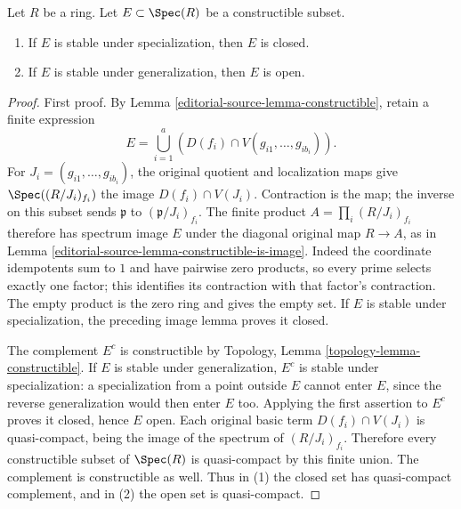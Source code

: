 \begin{lemma}
\label{editorial-source-lemma-constructible-stable-specialization-closed}
Let $R$ be a ring. Let $E \subset \Spec(R)$ be a constructible subset.
\begin{enumerate}
\item If $E$ is stable under specialization, then $E$ is closed.
\item If $E$ is stable under generalization, then $E$ is open.
\end{enumerate}
\end{lemma}

\begin{proof}
First proof. By Lemma \ref{editorial-source-lemma-constructible}, retain
a finite expression
$$
E=\bigcup_{i=1}^a\left(D(f_i)\cap
V(g_{i1},\ldots,g_{ib_i})\right).
$$
For $J_i=(g_{i1},\ldots,g_{ib_i})$, the original
quotient and localization maps give
$\Spec((R/J_i)_{f_i})$ the image $D(f_i)\cap V(J_i)$.
Contraction is the map; the inverse on this subset
sends $\mathfrak p$ to $(\mathfrak p/J_i)_{f_i}$.
The finite product $A=\prod_i(R/J_i)_{f_i}$ therefore
has spectrum image $E$ under the diagonal original
map $R\to A$, as in Lemma \ref{editorial-source-lemma-constructible-is-image}.
Indeed the coordinate idempotents sum to $1$ and
have pairwise zero products, so every prime selects
exactly one factor; this identifies its contraction
with that factor's contraction. The empty product
is the zero ring and gives the empty set.
If $E$ is stable under specialization, the preceding
image lemma proves it closed.

The complement $E^c$ is constructible by
Topology, Lemma \ref{topology-lemma-constructible}.
If $E$ is stable under generalization, $E^c$ is
stable under specialization: a specialization from
a point outside $E$ cannot enter $E$, since the
reverse generalization would then enter $E$ too.
Applying the first assertion to $E^c$ proves it
closed, hence $E$ open.
Each original basic term $D(f_i)\cap V(J_i)$ is
quasi-compact, being the image of the spectrum of
$(R/J_i)_{f_i}$. Therefore every constructible subset
of $\Spec(R)$ is quasi-compact by this finite union.
The complement is constructible as well. Thus in (1)
the closed set has quasi-compact complement, and in
(2) the open set is quasi-compact.


\end{proof}
